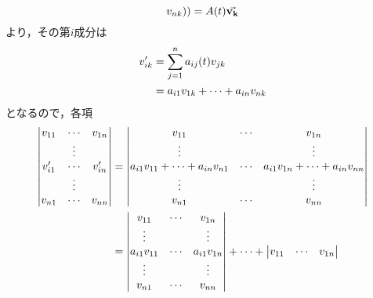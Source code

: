 \documentclass[autodetect-engine,dvipdfmx-if-dvi,ja=standard]{bxjsarticle}
\makeatletter
\theoremstyle{mystyle1}
\theoremstyle{mystyle2}
\renewenvironment{proof}[1][\proofname]{\par
  \pushQED{\qed}%
  \normalfont
  \topsep6\p@\@plus6\p@ \trivlist
  \item[\hskip\labelsep{\bfseries\sffamily #1}]\ignorespaces
}{%
  \popQED\endtrivlist\@endpefalse
}
\renewcommand\proofname{\ensuremath{\because}}
\makeatother
\begin{document}
\begin{proof}
\[      v_{nk}
      ))=A\qty(t)\va{v_k}\]
  より，その第$i$成分は
  \begin{align*}
    v^\prime_{ik}
     & =\sum_{j=1}^na_{ij}\qty(t)v_{jk}  \\
     & =a_{i1}v_{1k}+\cdots+a_{in}v_{nk}
  \end{align*}
  となるので，各項
  \begin{align*}
    \mdet{
    v_{11}                           & \cdots          & v_{1n}                           \\
                                     & \vdots          &                                  \\
    v_{i1}^\prime                    & \cdots          & v_{in}^\prime                    \\
                                     & \vdots          &                                  \\
    v_{n1}                           & \cdots          & v_{nn}
    }
                                     & =
    \mdet{
    v_{11}                           & \cdots          & v_{1n}                           \\
    \vdots                           &                 & \vdots                           \\
    a_{i1}v_{11}+\cdots+a_{in}v_{n1} & \cdots          & a_{i1}v_{1n}+\cdots+a_{in}v_{nn} \\
    \vdots                           &                 & \vdots                           \\
    v_{n1}                           & \cdots          & v_{nn}
    }                                                                                     \\
                                     & =
    \mdet{
    v_{11}                           & \cdots          & v_{1n}                           \\
    \vdots                           &                 & \vdots                           \\
    a_{i1}v_{11}                     & \cdots          & a_{i1}v_{1n}                     \\
    \vdots                           &                 & \vdots                           \\
    v_{n1}                           & \cdots          & v_{nn}
    }
    +\cdots+
    \mdet{
    v_{11}                           & \cdots          & v_{1n}                           \\
}
\end{align*}
\end{proof}
\end{document}
